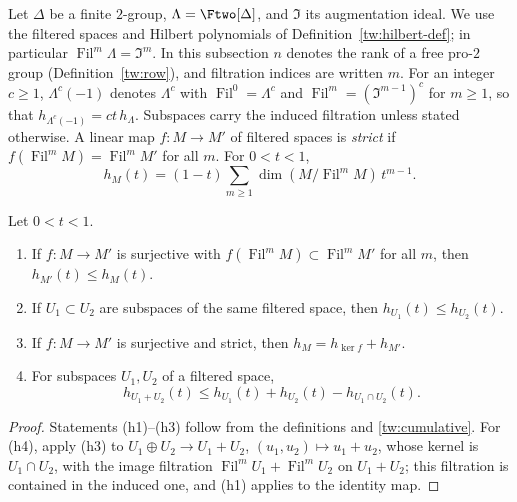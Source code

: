 Let $\Delta$ be a finite $2$-group, $\Lambda=\Ftwo[\Delta]$, and
$\mathfrak I$ its augmentation ideal. We use the filtered spaces and Hilbert
polynomials of Definition~\ref{tw:hilbert-def}; in particular
$\operatorname{Fil}^m\Lambda=\mathfrak I^m$. In this subsection $n$ denotes
the rank of a free pro-$2$ group (Definition~\ref{tw:row}), and filtration
indices are written $m$. For an integer $c\ge1$, $\Lambda^c(-1)$ denotes
$\Lambda^c$ with $\operatorname{Fil}^0=\Lambda^c$ and
$\operatorname{Fil}^m=(\mathfrak I^{m-1})^c$ for $m\ge1$, so that
$h_{\Lambda^c(-1)}=ct\,h_\Lambda$. Subspaces carry the induced filtration
unless stated otherwise. A linear map $f\colon M\to M'$ of filtered spaces is
\emph{strict} if $f(\operatorname{Fil}^mM)=\operatorname{Fil}^mM'$ for all
$m$. For $0<t<1$,
\begin{equation}\label{tw:cumulative}
 h_M(t)=(1-t)\sum_{m\ge1}\dim(M/\operatorname{Fil}^mM)\,t^{m-1}.
\end{equation}

\begin{lemma}\label{tw:hilbert-properties}
Let $0<t<1$.
\begin{enumerate}
\item[(h1)] If $f\colon M\to M'$ is surjective with
 $f(\operatorname{Fil}^mM)\subset\operatorname{Fil}^mM'$ for all $m$, then
 $h_{M'}(t)\le h_M(t)$.
\item[(h2)] If $U_1\subset U_2$ are subspaces of the same filtered space,
 then $h_{U_1}(t)\le h_{U_2}(t)$.
\item[(h3)] If $f\colon M\to M'$ is surjective and strict, then
 $h_M=h_{\ker f}+h_{M'}$.
\item[(h4)] For subspaces $U_1,U_2$ of a filtered space,
 \begin{equation}\label{tw:filtered-sum}
  h_{U_1+U_2}(t)\le h_{U_1}(t)+h_{U_2}(t)-h_{U_1\cap U_2}(t).
 \end{equation}
\end{enumerate}
\end{lemma}

\begin{proof}
Statements (h1)--(h3) follow from the definitions and \eqref{tw:cumulative}.
For (h4), apply (h3) to $U_1\oplus U_2\to U_1+U_2$, $(u_1,u_2)\mapsto u_1+u_2$,
whose kernel is $U_1\cap U_2$, with the image filtration
$\operatorname{Fil}^mU_1+\operatorname{Fil}^mU_2$ on
$U_1+U_2$; this filtration is contained in the induced one, and (h1) applies
to the identity map.
\end{proof}

